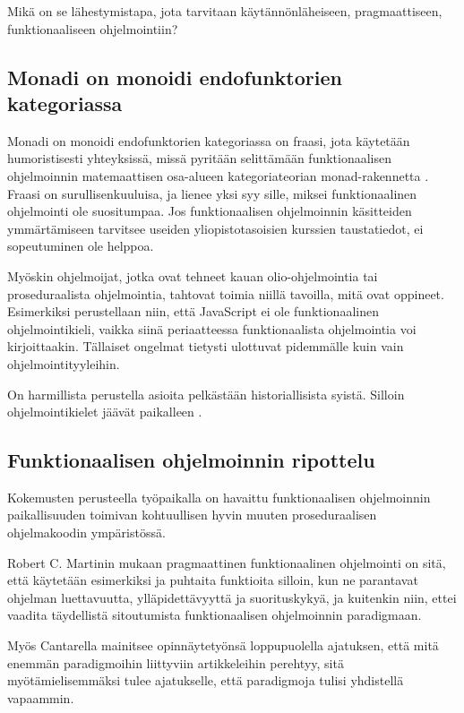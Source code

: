 Mikä on se lähestymistapa, jota tarvitaan käytännönläheiseen, pragmaattiseen, funktionaaliseen ohjelmointiin?

\subsection{Monadi on monoidi endofunktorien kategoriassa}

Monadi on monoidi endofunktorien kategoriassa on fraasi, jota käytetään humoristisesti yhteyksissä, missä pyritään selittämään funktionaalisen ohjelmoinnin matemaattisen osa-alueen kategoriateorian \gls{monad}-rakennetta \cite{bartosz_category_for_progamers_10}. Fraasi on surullisenkuuluisa, ja lienee yksi syy sille, miksei funktionaalinen ohjelmointi ole suositumpaa. Jos funktionaalisen ohjelmoinnin käsitteiden ymmärtämiseen tarvitsee useiden yliopistotasoisien kurssien taustatiedot, ei sopeutuminen ole helppoa.

Myöskin ohjelmoijat, jotka ovat tehneet kauan olio-ohjelmointia tai proseduraalista ohjelmointia, tahtovat toimia niillä tavoilla, mitä ovat oppineet. Esimerkiksi perustellaan niin, että JavaScript ei ole funktionaalinen ohjelmointikieli, vaikka siinä periaatteessa funktionaalista ohjelmointia voi kirjoittaakin. Tällaiset ongelmat tietysti ulottuvat pidemmälle kuin vain ohjelmointityyleihin. \citep{is_reduce_bad}

On harmillista perustella asioita pelkästään historiallisista syistä. Silloin ohjelmointikielet jäävät paikalleen \cite{promises-spec-94}.

\subsection{Funktionaalisen ohjelmoinnin ripottelu}

Kokemusten perusteella työpaikalla on havaittu funktionaalisen ohjelmoinnin paikallisuuden toimivan kohtuullisen hyvin muuten proseduraalisen ohjelmakoodin ympäristössä.

Robert C. Martinin mukaan pragmaattinen funktionaalinen ohjelmointi on sitä, että käytetään esimerkiksi  ja puhtaita funktioita silloin, kun ne parantavat ohjelman luettavuutta, ylläpidettävyyttä ja suorituskykyä, ja kuitenkin niin, ettei vaadita täydellistä sitoutumista funktionaalisen ohjelmoinnin paradigmaan. \citep{martin2017pragmaticfp}

Myös Cantarella mainitsee opinnäytetyönsä loppupuolella ajatuksen, että mitä enemmän paradigmoihin liittyviin artikkeleihin perehtyy, sitä myötämielisemmäksi tulee ajatukselle, että paradigmoja tulisi yhdistellä vapaammin. \citep[45]{cantarella_fp_haitat}

